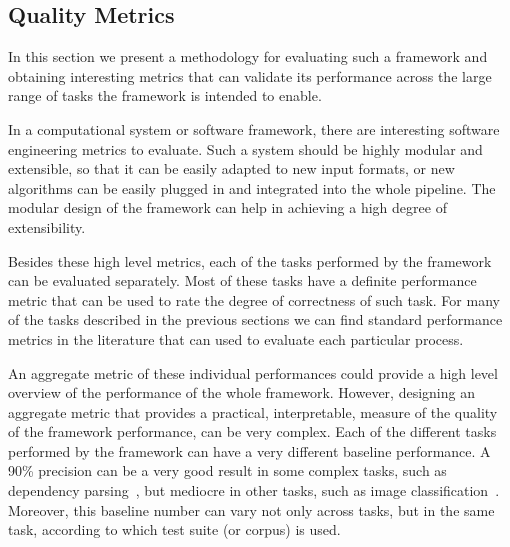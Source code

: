     \subsection{Quality Metrics}\label{sec:evaluation}

    In this section we present a methodology for evaluating such a framework and obtaining
    interesting metrics that can validate its performance across the large range of
    tasks the framework is intended to enable.

    In a computational system or software framework, there are interesting
    software engineering metrics to evaluate. Such a system should be highly modular and
    extensible, so that it can be easily adapted to new input formats, or new algorithms
    can be easily plugged in and integrated into the whole pipeline.
    The modular design of the framework can help in achieving a high
    degree of extensibility.

	Besides these high level metrics, each of the tasks performed by the framework can be
    evaluated separately. Most of these tasks have a definite performance metric that can
    be used to rate the degree of correctness of such task. For many of the tasks described in the previous
    sections we can find standard performance metrics in the literature that can used to
    evaluate each particular process.


    An aggregate metric of these individual performances could provide a high level
    overview of the performance of the whole framework.
    However, designing an aggregate metric that provides a practical, interpretable,
    measure of the quality of the framework performance, can be very complex.
    Each of the different tasks performed by the framework can have a very different
    baseline performance. A 90\% precision can be a very good result
    in some complex tasks, such as dependency parsing~\cite{AlbertiABCGKKMO17}, but mediocre in other tasks, such
    as image classification~\cite{Russakovsky2015}. Moreover, this baseline number can
    vary not only across tasks, but in the same task, according to which test suite (or corpus)
    is used.

